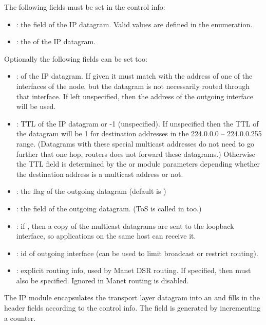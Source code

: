 The following fields must be set in the control info:
\begin{itemize}
  \item {}: the  field of the IP datagram. Valid values
        are defined in the  enumeration.
  \item {}: the  of the IP datagram.
\end{itemize}

Optionally the following fields can be set too:
\begin{itemize}
\item {}:  of the IP datagram. If given it must match with the
      address of one of the interfaces of the node, but the datagram is not necessarily
      routed through that interface. If left unspecified, then the address of the
      outgoing interface will be used.
\item {}: TTL of the IP datagram or -1 (unspecified). If unspecified then the TTL
      of the datagram will be 1 for destination addresses in the
      224.0.0.0 -- 224.0.0.255 range. (Datagrams with these special multicast addresses
      do not need to go further that one hop, routers does not forward these datagrams.)
      Otherwise the TTL field is determined by the  or
       module parameters depending whether the destination
      address is a multicast address or not.
\item {}: the  flag of the outgoing datagram (default is )
\item {}: the  field of the outgoing datagram.
      (ToS is called  in  too.)
\item {}: if , then a copy of the multicast datagrams
      are sent to the loopback interface, so applications on the same host can receive it.
\item {}: id of outgoing interface (can be used to limit broadcast or restrict routing).
\item {}: explicit routing info, used by Manet DSR routing. If specified, then
       must also be specified. Ignored in Manet routing is disabled.
\end{itemize}

The IP module encapsulates the transport layer datagram into an 
and fills in the header fields according to the control info. The 
field is generated by incrementing a counter.

